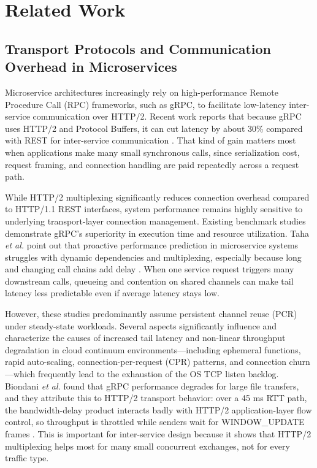\documentclass{ieeeaccess}
\begin{document}
\section{Related Work}
\label{sec:related-work}

\subsection{Transport Protocols and Communication Overhead in Microservices}
Microservice architectures increasingly rely on high-performance Remote Procedure Call (RPC) frameworks, such as gRPC, to facilitate low-latency inter-service communication over HTTP/2.  Recent work reports that because gRPC uses HTTP/2 and Protocol Buffers, it can cut latency by about 30\% compared with REST for inter-service communication \cite{alzahrani2026scalable}. That kind of gain matters most when applications make many small synchronous calls, since serialization cost, request framing, and connection handling are paid repeatedly across a request path.   

While HTTP/2 multiplexing significantly reduces connection overhead compared to HTTP/1.1 REST interfaces, system performance remains highly sensitive to underlying transport-layer connection management. Existing benchmark studies demonstrate gRPC's superiority in execution time and resource utilization. Taha \emph{et al.} point out that proactive performance prediction in microservice systems struggles with dynamic dependencies and multiplexing, especially because long and changing call chains add delay \cite{taha2024proactive}. When one service request triggers many downstream calls, queueing and contention on shared channels can make tail latency less predictable even if average latency stays low.

However, these studies predominantly assume persistent channel reuse (PCR) under steady-state workloads. Several aspects significantly influence and characterize the causes of increased tail latency and non-linear throughput degradation in cloud continuum environments—including ephemeral functions, rapid auto-scaling, connection-per-request (CPR) patterns, and connection churn—which frequently lead to the exhaustion of the OS TCP listen backlog. Biondani \emph{et al.} found that gRPC performance degrades for large file transfers, and they attribute this to HTTP/2 transport behavior: over a 45 ms RTT path, the bandwidth-delay product interacts badly with HTTP/2 application-layer flow control, so throughput is throttled while senders wait for WINDOW\_UPDATE frames \cite{biondani2026mate}. This is important for inter-service design because it shows that HTTP/2 multiplexing helps most for many small concurrent exchanges, not for every traffic type.
\end{document}
